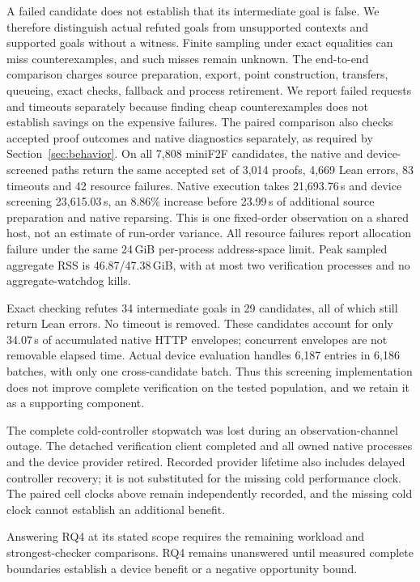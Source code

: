\documentclass[10pt,twocolumn]{article}
\begin{document}
A failed candidate does not establish that its intermediate goal is false.
We therefore distinguish actual refuted goals from unsupported contexts and
supported goals without a witness. Finite sampling under exact equalities can
miss counterexamples, and such misses remain unknown. The end-to-end
comparison charges source preparation, export, point construction, transfers,
queueing, exact checks, fallback and process retirement. We report failed
requests and timeouts separately because finding cheap counterexamples does
not establish savings on the expensive failures.
The paired comparison also checks accepted proof outcomes and native
diagnostics separately, as required by Section~\ref{sec:behavior}.
On all 7,808 miniF2F candidates, the native and device-screened paths
return the same accepted set of 3,014 proofs, 4,669 Lean errors, 83 timeouts
and 42 resource failures. Native execution takes 21,693.76\,s and device
screening 23,615.03\,s, an 8.86\% increase before 23.99\,s of additional
source preparation and native reparsing. This is one fixed-order observation
on a shared host, not an estimate of run-order variance.
All resource failures report allocation failure under the same 24\,GiB
per-process address-space limit. Peak sampled aggregate RSS is 46.87/47.38\,GiB,
with at most two verification processes and no aggregate-watchdog kills.

Exact checking refutes 34 intermediate goals in 29 candidates, all of which
still return Lean errors. No timeout is removed. These candidates account
for only 34.07\,s of accumulated native HTTP envelopes; concurrent envelopes
are not removable elapsed time. Actual device evaluation handles 6,187
entries in 6,186 batches, with only one cross-candidate batch. Thus this
screening implementation does not improve complete verification on the
tested population, and we retain it as a supporting component.

The complete cold-controller stopwatch was lost during an observation-channel
outage. The detached verification client completed and all owned native
processes and the device provider retired. Recorded provider lifetime also
includes delayed controller recovery; it is not substituted for the missing
cold performance clock. The paired cell clocks above remain independently
recorded, and the missing cold clock cannot establish an additional benefit.


Answering RQ4 at its stated scope requires the remaining workload and
strongest-checker comparisons. RQ4 remains unanswered until measured
complete boundaries establish a device benefit or a negative opportunity bound.
\end{document}
